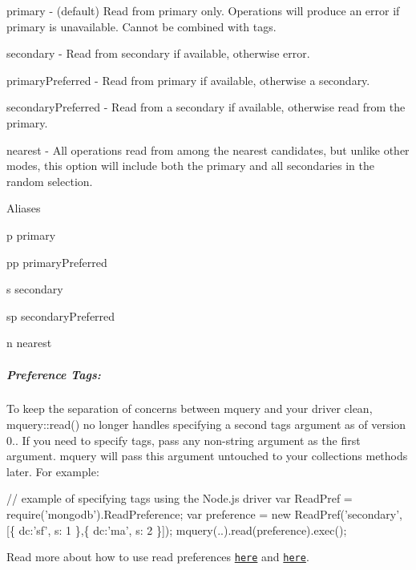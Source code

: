 \begin{DoxyItemize}
\item {\ttfamily primary} -\/ (default) Read from primary only. Operations will produce an error if primary is unavailable. Cannot be combined with tags.
\item {\ttfamily secondary} -\/ Read from secondary if available, otherwise error.
\item {\ttfamily primary\+Preferred} -\/ Read from primary if available, otherwise a secondary.
\item {\ttfamily secondary\+Preferred} -\/ Read from a secondary if available, otherwise read from the primary.
\item {\ttfamily nearest} -\/ All operations read from among the nearest candidates, but unlike other modes, this option will include both the primary and all secondaries in the random selection.
\end{DoxyItemize}

Aliases


\begin{DoxyItemize}
\item {\ttfamily p} primary
\item {\ttfamily pp} primary\+Preferred
\item {\ttfamily s} secondary
\item {\ttfamily sp} secondary\+Preferred
\item {\ttfamily n} nearest
\end{DoxyItemize}

\subparagraph*{Preference Tags\+:}

To keep the separation of concerns between {\ttfamily mquery} and your driver clean, {\ttfamily mquery\+::read()} no longer handles specifying a second {\ttfamily tags} argument as of version 0.. If you need to specify tags, pass any non-\/string argument as the first argument. {\ttfamily mquery} will pass this argument untouched to your collections methods later. For example\+:


\begin{DoxyCode}
// example of specifying tags using the Node.js driver
var ReadPref = require('mongodb').ReadPreference;
var preference = new ReadPref('secondary', [\{ dc:'sf', s: 1 \},\{ dc:'ma', s: 2 \}]);
mquery(..).read(preference).exec();
\end{DoxyCode}


Read more about how to use read preferences \href{http://docs.mongodb.org/manual/applications/replication/#read-preference}{\tt here} and \href{http://mongodb.github.com/node-mongodb-native/driver-articles/anintroductionto1_1and2_2.html#read-preferences}{\tt here}.

